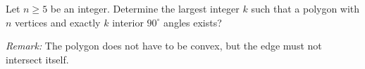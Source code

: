 Let $n\geq 5$ be an integer. Determine the largest integer $k$ such that a polygon
with $n$ vertices and exactly $k$ interior $90^\circ$ angles exists?

\emph{Remark:} The polygon does not have to be convex, but the edge must not intersect itself.

